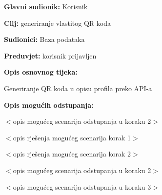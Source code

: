 	\noindent {}
\begin{packed_item}
	
	\item \textbf{Glavni sudionik: }Korisnik
	\item  \textbf{Cilj:} generiranje vlastitog QR koda
	\item  \textbf{Sudionici:}
	Baza podataka
	\item  \textbf{Preduvjet:} korisnik prijavljen
	\item  \textbf{Opis osnovnog tijeka:}
	
	\item[] \begin{packed_enum}
		
		\item	Generiranje QR koda u opisu profila preko API-a
	\end{packed_enum}
	
	\item  \textbf{Opis mogućih odstupanja:}
	
	\item[] \begin{packed_item}
		
		\item[2.a] $<$opis mogućeg scenarija odstupanja u koraku 2$>$
		\item[] \begin{packed_enum}
			
			\item $<$opis rješenja mogućeg scenarija korak 1$>$
			\item $<$opis rješenja mogućeg scenarija korak 2$>$
			
		\end{packed_enum}
		\item[2.b] $<$opis mogućeg scenarija odstupanja u koraku 2$>$
		\item[3.a] $<$opis mogućeg scenarija odstupanja  u koraku 3$>$
		
	\end{packed_item}
\end{packed_item}

